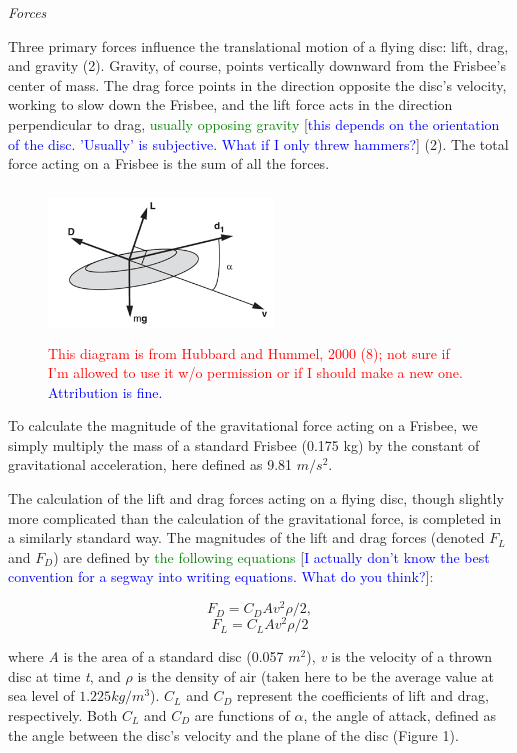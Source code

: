 \documentclass[a4paper,12pt, oneside]{article}
\newcommand{\red}[1]{\textcolor{red}{#1}}
\newcommand{\blue}[1]{\textcolor{blue}{#1}}
\newcommand{\green}[1]{\textcolor{green}{#1}}
\begin{document}
\textit{Forces}

Three primary forces influence the translational motion of a flying disc: lift, drag, and gravity (2). Gravity, of course, points vertically downward from the Frisbee's center of mass.  The drag force points in the direction opposite the disc's velocity, working to slow down the Frisbee, and the lift force acts in the direction perpendicular to drag, \green{usually opposing gravity} [\blue{this depends on the orientation of the disc. 'Usually' is subjective. What if I only threw hammers?}] (2). The total force acting on a Frisbee is the sum of all the forces.
\begin{figure}[h]
        \includegraphics[width=6cm, height=4cm]{frisforces}
	\centering
	\caption{\red{This diagram is from Hubbard and Hummel, 2000 (8); not sure if I'm allowed to use it w/o permission or if I should make a new one.} \blue{Attribution is fine.}}
\end{figure}

To calculate the magnitude of the gravitational force acting on a Frisbee, we simply multiply the mass of a standard Frisbee (0.175 kg) by the constant of gravitational acceleration, here defined as  9.81 $m/s^{2}.$ 
 
The calculation of the lift and drag forces acting on a flying disc, though slightly more complicated than the calculation of the gravitational force, is completed in a similarly standard way. The magnitudes of the lift and drag forces (denoted $F_L$ and $F_D$) are defined by \green{the following equations} [\blue{I actually don't know the best convention for a segway into writing equations. What do you think?}]\green{:}

\begin{equation}
  F_D=C_DAv^2\rho/2,
\end{equation}
\begin{equation}
  F_L=C_LAv^2\rho/2
\end{equation}

where \textit{A} is the area of a standard disc (0.057 $m^2$), \textit{v} is the velocity of a thrown disc at time \textit{t}, and $\rho$ is the density of air (taken here to be the average value at sea level of $1.225 kg/m^3$). $C_L$ and $C_D$ represent the coefficients of lift and drag, respectively. Both $C_L$ and $C_D$ are functions of $\alpha$, the angle of attack, defined as the angle between the disc's velocity and the plane of the disc (Figure 1). 
\end{document}
